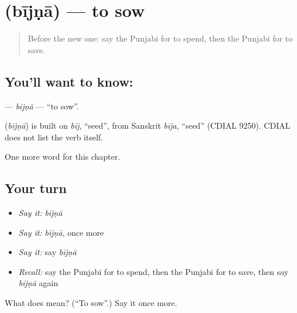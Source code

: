 \section[\texorpdfstring{\pa{ਬੀਜਣਾ} (bījṇā)}{ਬੀਜਣਾ (bījṇā)}]{ (bījṇā) — to sow}

\label{lesson:PA-C151-bijna}



\begin{quote}
Before the new one: say the Punjabi for to spend, then the Punjabi for to save.
\end{quote}

\subsection*{You'll want to know: }
\textbf{} — \emph{bījṇā} — \textquotedblleft{}to sow\textquotedblright{}.

\begin{cousinweb}
\textbf{} (\emph{bījṇā}) is built on \emph{bīj}, \textquotedblleft{}seed\textquotedblright{}, from Sanskrit \emph{bīja}, \textquotedblleft{}seed\textquotedblright{} (CDIAL 9250). CDIAL does not list the verb itself.
\end{cousinweb}

\begin{grammarlens}[title={What you've built}]
One more word for this chapter.
\end{grammarlens}

\subsection*{Your turn}
\begin{itemize}
\raggedright
  \item \emph{Say it:} \emph{bījṇā}
  \item \emph{Say it:} \emph{bījṇā}, once more
  \item \emph{Say it:} say \emph{bījṇā}
  \item \emph{Recall:} say the Punjabi for to spend, then the Punjabi for to save, then say \emph{bījṇā} again
\end{itemize}

\begin{tcolorbox}[breakable,colback=teal!4,colframe=teal!35!black,title={Before you move on}]
What does  mean? (\textquotedblleft{}To sow\textquotedblright{}.) Say it once more.
\end{tcolorbox}
